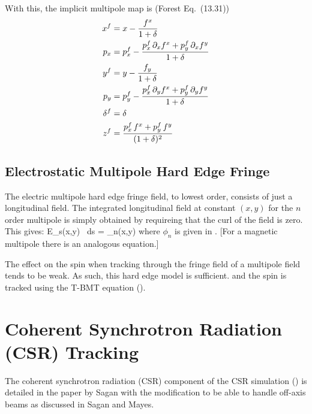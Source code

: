 With this, the implicit multipole map is (Forest Eq.~(13.31))
\begin{align}
  x^f &= x - \frac{f^x}{1 + \delta} \nonumber \\
  p_x &= p_x^f - \frac{p_x^f \, \partial_x f^x + p_y^f \, \partial_x f^y}{1 + \delta} \nonumber \\
  y^f &= y - \frac{f_y}{1 + \delta} \\
  p_y &= p_y^f - \frac{p_x^f \, \partial_y f^x + p_y^f \, \partial_y f^y}{1 + \delta} \nonumber \\
  \delta^f &= \delta \nonumber \\
  z^f &=\frac{p_x^f \, f^x + p_y^f \, f^y}{(1 + \delta)^2} \nonumber
\end{align}

\subsection{Electrostatic Multipole Hard Edge Fringe}
\label{s:spin.hard.fringe}

The electric multipole hard edge fringe field, to lowest order, consists of just a
longitudinal field. The integrated longitudinal field at constant $(x,y)$ for the $n$\Th
order multipole is simply obtained by requireing that the curl of the field is zero.
This gives:
\Begineq
  \int E_s(x,y) \, ds = \phi_n(x,y)
\Endeq
where $\phi_n$ is given in . [For a magnetic multipole there is an analogous
equation.]

The effect on the spin when tracking through the fringe field of a multipole field tends
to be weak. As such, this hard edge model is sufficient.  and the spin is tracked using
the T-BMT equation ().

\section{Coherent Synchrotron Radiation (CSR) Tracking}
\label{s:csr.track}

The coherent synchrotron radiation (CSR) component of the CSR simulation () is detailed
in the paper by Sagan\cite{b:csr} with the modification to be able to handle off-axis beams as
discussed in Sagan and Mayes\cite{b:csr2}.


